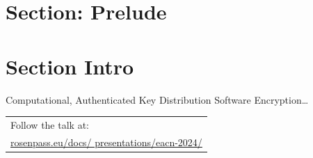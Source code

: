 \section{Section: Prelude}

\section{Section Intro}

\begin{frame}{Computational, Authenticated Key Distribution}
  \small
  Software Encryption…

  \begin{itemize}
  \end{itemize}



	\vfill

    \begin{tabular}[c]{@{\space}l}
    Follow the talk at:\\
    \footnotesize\href{rosenpass.eu/docs/presentations/eacn-2024/}{rosenpass.eu/docs/ presentations/eacn-2024/}
    \end{tabular}



\end{frame}




